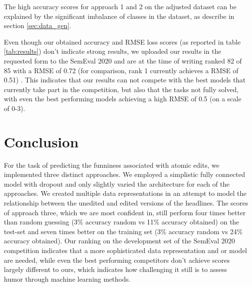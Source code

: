 \documentclass[11pt,a4paper]{article}
\begin{document}
The high accuracy scores for approach 1 and 2 on the adjusted dataset can be explained by the significant imbalance of classes in the dataset, as describe in section \ref{sec:data_gen}. 

Even though our obtained accuracy and RMSE loss scores (as reported in table \ref{tab:results}) don't indicate strong results, we uploaded our results in the requested form to the SemEval 2020 and are at the time of writing ranked 82 of 85 with a RMSE of 0.72 (for comparison, rank 1 currently achieves a RMSE of 0.51) \cite{rankings}. This indicates that our results can not compete with the best models that currently take part in the competition, but also that the tasks not fully solved, with even the best performing models achieving a high RMSE of 0.5 (on a scale of 0-3).

\section{Conclusion}
For the task of predicting the funniness associated with atomic edits, we implemented three distinct approaches. We employed a simplistic fully connected model with dropout and only slightly varied the architecture for each of the approaches. We created multiple data representations in an attempt to model the relationship between the unedited and edited versions of the headlines. The scores of approach three, which we are most confident in, still perform four times better than random guessing (3\% accuracy random vs 11\% accuracy obtained) on the test-set and seven times better on the training set (3\% accuracy random vs 24\% accuracy obtained). Our ranking on the development set of the SemEval 2020 competition indicates that a more sophisticated data representation and or model are needed, while even the best performing competitors don't achieve scores largely different to ours, which indicates how challenging it still is to assess humor through machine learning methods.
\end{document}
